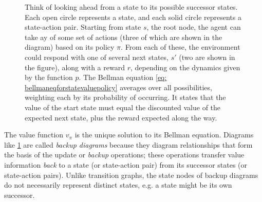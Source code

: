 \documentclass[12pt]{article}
\begin{document}
\begin{figure}[h]
  \centering
\caption{\footnotesize Think of looking ahead from a state to its possible successor states. Each open circle represents a state, and each solid circle represents a state-action pair. Starting from state $s$, the root node, the agent can take ay of some set of actions (three of which are shown in the diagram) based on its policy $\pi$. From each of these, the environment could respond with one of several next states, $s'$ (two are shown in the figure), along with a reward $r$, depending on the dynamics given by the function $p$. The Bellman equation \ref{eq: bellmaneqforstatevaluepolicy} averages over all possibilities, weighting each by its probability of occurring. It states that the value of the start state must equal the discounted value of the expected next state, plus the reward expected along the way.}
\label{fig: bellmanlookahead}
\end{figure}

The value function $v_\pi$ is the unique solution to its Bellman equation. Diagrams like \ref{fig: bellmanlookahead} are called \emph{backup diagrams} because they diagram relationships that form the basis of the update or \emph{backup} operations; these operations transfer value information \emph{back} to a state (or state-action pair) from its successor states (or state-action pairs). Unlike transition graphs, the state nodes of backup diagrams do not necessarily represent distinct states, e.g. a state might be its own successor.
\end{document}
